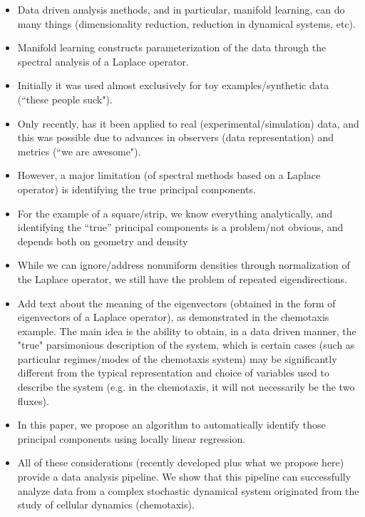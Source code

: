 \documentclass[preprint]{elsarticle}
\begin{document}
\begin{itemize}

\item
Data driven analysis methods, and in particular, manifold learning, can do many things (dimensionality reduction, reduction in dynamical systems, etc). 

\item
Manifold learning constructs parameterization of the data through the spectral analysis of a Laplace operator.

\item
Initially it was used almost exclusively for toy examples/synthetic data (``these people suck").

\item
Only recently, has it been applied to real (experimental/simulation) data, and this was possible due to advances in observers (data representation) and metrics (``we are awesome"). 

\item
However, a major limitation (of spectral methods based on a Laplace operator) is identifying the true principal components.

\item For the example of a square/strip, we know everything analytically, and identifying the ``true'' principal components is a problem/not obvious, and depends both on geometry and density

\item While we can ignore/address nonuniform densities through normalization of the Laplace operator, we still have the problem of repeated eigendirections. 

\item Add text about the meaning of the eigenvectors (obtained in the form of eigenvectors of a Laplace operator), as demonstrated in the chemotaxis example. The main idea is the ability to obtain, in a data driven manner, the "true" parsimonious description of the system, which is certain cases (such as particular regimes/modes of the chemotaxis system) may be significantly different from the typical representation and choice of variables used to describe the system (e.g. in the chemotaxis, it will not necessarily be the two fluxes).  

\item
In this paper, we propose an algorithm to automatically identify those principal components using locally linear regression.

\item
All of these considerations (recently developed plus what we propose here) provide a data analysis pipeline. We show that this pipeline can successfully analyze data from a complex stochastic dynamical system originated from the study of cellular dynamics (chemotaxis).

\end{itemize}
\end{document}
